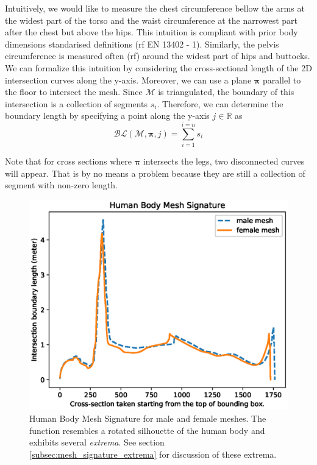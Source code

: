 \documentclass[runningheads]{llncs}
\begin{document}
Intuitively, we would like to measure the chest circumference bellow the arms 
at the widest part of the torso and the waist circumference at the 
narrowest part after the chest but above the hips. This intuition is compliant 
with prior body dimensions standarised definitions (rf EN 13402 - 1). 
Similarly, the pelvis 
circumference is measured often (rf) around the widest part of hips and 
buttocks. We 
can formalize this intuition by considering the cross-sectional length of the 
2D intersection curves \cite{book.compu.topo} along the y-axis. Moreover, we 
can 
use a plane $\boldsymbol{\pi}$ parallel to the floor to intersect the mesh. 
Since $\mathcal{M}$ is 
triangulated, the boundary of this 
intersection is a collection of segments $s_i$. Therefore, we can 
determine the boundary length by specifying a point along the y-axis $j \in 
\mathbb{R}$ as
\begin{equation}
\mathcal{BL}(\mathcal{M}, \boldsymbol{\pi}, j) = \sum_{i = 
	1}^{i = n}s_i
\end{equation}

Note that for cross sections where $\boldsymbol{\pi}$ intersects the legs, two 
disconnected curves will appear. That is by no means a problem because they are 
still a collection of segment with non-zero length.

\begin{figure}[t]
	\begin{center}
		\includegraphics[width=\linewidth]{Figure_1.eps}
	\end{center}
	\caption{Human Body Mesh Signature for male and female meshes. The 
		function resembles a rotated silhouette of the human body and exhibits 
		several \textit{extrema}. See section 
		\ref{subsec:mesh_signature_extrema} for discussion of these extrema.}
	\label{fig:hbm_signature}
\end{figure}
\end{document}
